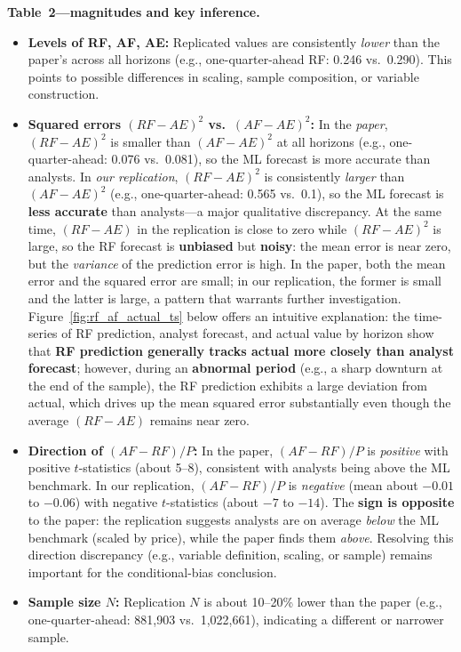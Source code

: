 \documentclass[11pt]{article}
\begin{document}
\textbf{Table~2---magnitudes and key inference.}
\begin{itemize}
\item \textbf{Levels of RF, AF, AE:} Replicated values are consistently \emph{lower} than the paper's across all horizons (e.g., one-quarter-ahead RF: 0.246 vs.\ 0.290). This points to possible differences in scaling, sample composition, or variable construction.
\item \textbf{Squared errors $(RF-AE)^2$ vs.\ $(AF-AE)^2$:} In the \emph{paper}, $(RF-AE)^2$ is smaller than $(AF-AE)^2$ at all horizons (e.g., one-quarter-ahead: 0.076 vs.\ 0.081), so the ML forecast is more accurate than analysts. In \emph{our replication}, $(RF-AE)^2$ is consistently \emph{larger} than $(AF-AE)^2$ (e.g., one-quarter-ahead: 0.565 vs.\ 0.1), so the ML forecast is \textbf{less accurate} than analysts---a major qualitative discrepancy. At the same time, $(RF-AE)$ in the replication is close to zero while $(RF-AE)^2$ is large, so the RF forecast is \textbf{unbiased} but \textbf{noisy}: the mean error is near zero, but the \emph{variance} of the prediction error is high. In the paper, both the mean error and the squared error are small; in our replication, the former is small and the latter is large, a pattern that warrants further investigation. Figure~\ref{fig:rf_af_actual_ts} below offers an intuitive explanation: the time-series of RF prediction, analyst forecast, and actual value by horizon show that \textbf{RF prediction generally tracks actual more closely than analyst forecast}; however, during an \textbf{abnormal period} (e.g., a sharp downturn at the end of the sample), the RF prediction exhibits a large deviation from actual, which drives up the mean squared error substantially even though the average $(RF-AE)$ remains near zero.
\item \textbf{Direction of $(AF-RF)/P$:} In the paper, $(AF-RF)/P$ is \emph{positive} with positive $t$-statistics (about 5--8), consistent with analysts being above the ML benchmark. In our replication, $(AF-RF)/P$ is \emph{negative} (mean about $-0.01$ to $-0.06$) with negative $t$-statistics (about $-7$ to $-14$). The \textbf{sign is opposite} to the paper: the replication suggests analysts are on average \emph{below} the ML benchmark (scaled by price), while the paper finds them \emph{above}. Resolving this direction discrepancy (e.g., variable definition, scaling, or sample) remains important for the conditional-bias conclusion.
\item \textbf{Sample size $N$:} Replication $N$ is about 10--20\% lower than the paper (e.g., one-quarter-ahead: 881,903 vs.\ 1,022,661), indicating a different or narrower sample.
\end{itemize}
\end{document}
